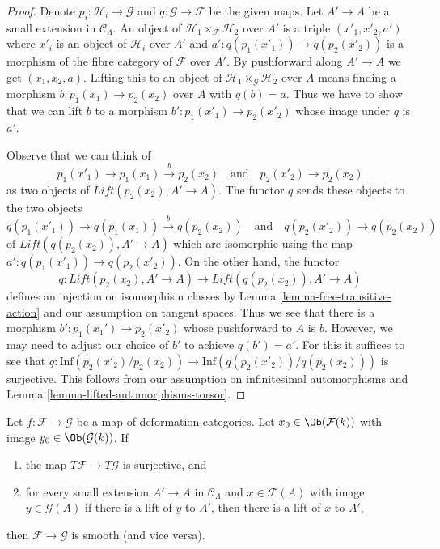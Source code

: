 \begin{proof}
Denote $p_i : \mathcal{H}_i \to \mathcal{G}$ and
$q : \mathcal{G} \to \mathcal{F}$ be the given maps.
Let $A' \to A$ be a small extension in $\mathcal{C}_\Lambda$.
An object of $\mathcal{H}_1 \times_\mathcal{F} \mathcal{H}_2$
over $A'$ is a triple $(x'_1, x'_2, a')$ where
$x'_i$ is an object of $\mathcal{H}_i$ over $A'$ and
$a' : q(p_1(x'_1)) \to q(p_2(x'_2))$ is a morphism
of the fibre category of $\mathcal{F}$ over $A'$.
By pushforward along $A' \to A$ we get
$(x_1, x_2, a)$. Lifting this to an object of
$\mathcal{H}_1 \times_\mathcal{G} \mathcal{H}_2$
over $A$ means finding a morphism
$b : p_1(x_1) \to p_2(x_2)$ over $A$ with $q(b) = a$.
Thus we have to show that we can lift $b$ to a morphism
$b' : p_1(x'_1) \to p_2(x'_2)$ whose image under $q$ is $a'$.

\medskip\noindent
Observe that we can think of
$$
p_1(x'_1) \to p_1(x_1) \xrightarrow{b} p_2(x_2)
\quad\text{and}\quad
p_2(x'_2) \to p_2(x_2)
$$
as two objects of $\textit{Lift}(p_2(x_2), A' \to A)$.
The functor $q$ sends these objects to the two objects
$$
q(p_1(x'_1)) \to q(p_1(x_1)) \xrightarrow{b} q(p_2(x_2))
\quad\text{and}\quad
q(p_2(x'_2)) \to q(p_2(x_2))
$$
of $\textit{Lift}(q(p_2(x_2)), A' \to A)$
which are isomorphic using the map $a' : q(p_1(x'_1)) \to q(p_2(x'_2))$.
On the other hand, the functor
$$
q : \textit{Lift}(p_2(x_2), A' \to A) \to
\textit{Lift}(q(p_2(x_2)), A' \to A)
$$
defines an injection on isomorphism classes by
Lemma \ref{lemma-free-transitive-action}
and our assumption on tangent spaces. Thus we see that there is a morphism
$b' : p_1(x_1') \to p_2(x'_2)$ whose pushforward to $A$ is $b$.
However, we may need to adjust our choice of $b'$
to achieve $q(b') = a'$. For this it suffices to see that
$q : \text{Inf}(p_2(x'_2)/p_2(x_2)) \to \text{Inf}(q(p_2(x'_2))/q(p_2(x_2)))$
is surjective. This follows from our assumption on
infinitesimal automorphisms and Lemma \ref{lemma-lifted-automorphisms-torsor}.
\end{proof}

\begin{lemma}
\label{lemma-easy-check-smooth}
Let $f : \mathcal{F} \to \mathcal{G}$ be a map of deformation
categories. Let $x_0 \in \Ob(\mathcal{F}(k))$ with image
$y_0 \in \Ob(\mathcal{G}(k))$. If
\begin{enumerate}
\item the map $T\mathcal{F} \to T\mathcal{G}$ is surjective, and
\item for every small extension $A' \to A$ in $\mathcal{C}_\Lambda$
and $x \in \mathcal{F}(A)$ with image $y \in \mathcal{G}(A)$
if there is a lift of $y$ to $A'$, then there is a lift
of $x$ to $A'$,
\end{enumerate}
then $\mathcal{F} \to \mathcal{G}$ is smooth (and vice versa).
\end{lemma}

